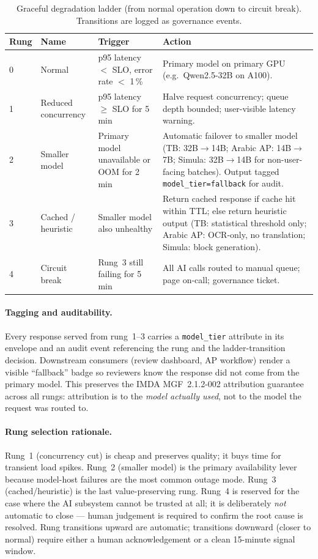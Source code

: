 \begin{table}[htbp]
\centering
\caption{Graceful degradation ladder (from normal operation down
to circuit break). Transitions are logged as governance events.}
\label{tab:degradation-ladder}
\footnotesize
\begin{tabularx}{\linewidth}{@{}l l l X@{}}
\toprule
\textbf{Rung} & \textbf{Name} & \textbf{Trigger} & \textbf{Action} \\ \midrule
0 & Normal & p95 latency $<$ SLO, error rate $<$ 1\,\% & Primary model on primary GPU (e.g.\ Qwen2.5-32B on A100). \\
1 & Reduced concurrency & p95 latency $\ge$ SLO for 5\,min & Halve request concurrency; queue depth bounded; user-visible latency warning. \\
2 & Smaller model & Primary model unavailable or OOM for 2\,min & Automatic failover to smaller model (TB: 32B$\to$14B; Arabic AP: 14B$\to$7B; Simula: 32B$\to$14B for non-user-facing batches). Output tagged \texttt{model\_tier=fallback} for audit. \\
3 & Cached / heuristic & Smaller model also unhealthy & Return cached response if cache hit within TTL; else return heuristic output (TB: statistical threshold only; Arabic AP: OCR-only, no translation; Simula: block generation). \\
4 & Circuit break & Rung~3 still failing for 5\,min & All AI calls routed to manual queue; page on-call; governance ticket. \\
\bottomrule
\end{tabularx}
\end{table}

\paragraph{Tagging and auditability.}
Every response served from rung~1--3 carries a \texttt{model\_tier}
attribute in its envelope and an audit event referencing the rung
and the ladder-transition decision. Downstream consumers (review
dashboard, AP workflow) render a visible ``fallback'' badge so
reviewers know the response did not come from the primary model.
This preserves the IMDA MGF~2.1.2-002 attribution guarantee across
all rungs: attribution is to the \emph{model actually used}, not
to the model the request was routed to.

\paragraph{Rung selection rationale.}
Rung~1 (concurrency cut) is cheap and preserves quality; it buys
time for transient load spikes. Rung~2 (smaller model) is the
primary availability lever because model-host failures are the
most common outage mode. Rung~3 (cached/heuristic) is the last
value-preserving rung. Rung~4 is reserved for the case where the
AI subsystem cannot be trusted at all; it is deliberately
\emph{not} automatic to close --- human judgement is required to
confirm the root cause is resolved. Rung transitions upward are
automatic; transitions downward (closer to normal) require either
a human acknowledgement or a clean 15-minute signal window.

